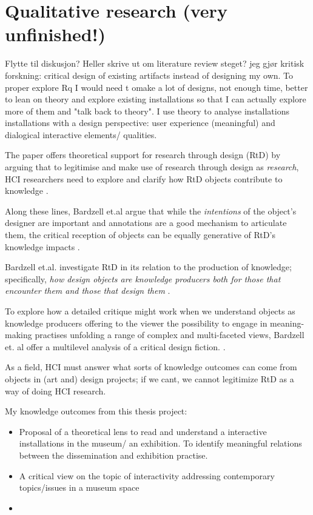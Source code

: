 \section{Qualitative research (very unfinished!)}
Flytte til diskusjon? Heller skrive ut om literature review steget?
jeg gjør kritisk forskning: critical design of existing artifacts instead of designing my own. To proper explore Rq I would need t omake a lot of designs, not enough time, better to lean on theory and explore existing installations so that I can actually explore more of them and "talk back to theory". I use theory to analyse installations installations with a design perspective: user experience (meaningful) and dialogical interactive elements/ qualities. 

The paper offers theoretical support for research through design (RtD) by arguing that to legitimise and make use of research through design as \emph{research}, HCI researchers need to explore and clarify how RtD objects contribute to knowledge \autocite[p.2093]{bardzell_immodest_2015}.


Along these lines, Bardzell et.al argue that while the \emph{intentions} of the object's designer are important and annotations are a good mechanism to articulate them, the critical reception of objects can be equally generative of RtD's knowledge impacts \autocite[p. 2093]{bardzell_immodest_2015}.

Bardzell et.al. investigate RtD in its relation to the production of knowledge; specifically, \emph{how design objects are knowledge producers both for those that encounter them and those that design them} \autocite[p. 2093]{bardzell_immodest_2015}. 

To explore how a detailed critique might work when we understand objects as knowledge producers offering to the viewer the possibility to engage in meaning-making practises unfolding a range of complex and multi-faceted views, Bardzell et. al offer a multilevel analysis of a critical design fiction. \autocite[p. 2094]{bardzell_immodest_2015}.

As a field, HCI must answer what sorts of knowledge outcomes can come from objects in (art and) design projects; if we cant, we cannot legitimize RtD as a way of doing HCI research.

My knowledge outcomes from this thesis project:
\begin{itemize}
    \item Proposal of a theoretical lens to read and understand a interactive installations in the museum/ an exhibition. To identify meaningful relations between the dissemination and exhibition practise.
    \item A critical view on the topic of interactivity addressing contemporary topics/issues in a museum space
    \item 
\end{itemize}

